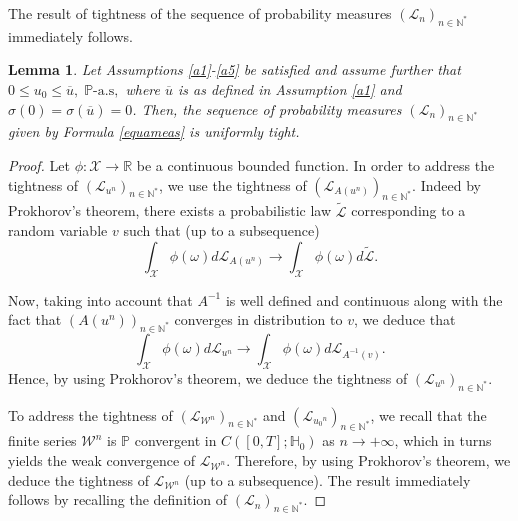 \documentclass[10pt,number,preprint,times]{elsarticle}
\numberwithin{equation}{section} %
\newtheorem{lem}{Lemma}[section]
\begin{document}
\color{black}
\noindent
The result of tightness of the sequence of probability measures $\left(\mathscr{L}_n\right)_{n \in \mathbb{N}^*}$ immediately follows. 
\begin{lem}\label{tight}
	Let Assumptions \ref{a1}-\ref{a5} be satisfied and assume further that $0 \leq u_0 \leq \overline{u},\; \mathbb{P}\text{-a.s},$ where $\overline{u}$ is as defined in Assumption \ref{a1} and $\sigma(0)=\sigma(\overline{u})=0$. Then, the sequence of probability measures $\left(\mathscr{L}_n\right)_{n \in \mathbb{N}^*}$ given by Formula \eqref{equameas} is uniformly tight.
\end{lem}
\begin{proof}
	
	\noindent
	Let $\phi : \mathscr{X} \rightarrow \mathbb{R}$ be a continuous bounded function.  In order to address the tightness of $\left(\mathscr{L}_{u^n}\right)_{n \in \mathbb{N}^*}$, we use the tightness of $\left(\mathscr{L}_{A(u^n)}\right)_{n \in \mathbb{N}^*}$. Indeed by Prokhorov's theorem, there exists a probabilistic law $\tilde{\mathscr{L}}$ corresponding to a random variable $v$ such that (up to a subsequence) 
	$$
	\int_{\mathscr{X}} \phi(\omega) d\mathscr{L}_{A(u^n)} \rightarrow \int_{\mathscr{X}} \phi(\omega) d\tilde{\mathscr{L}}.
	$$
	
	\noindent
	Now, taking into account that $A^{-1}$ is well defined and continuous along with the fact that $(A(u^n))_{n \in \mathbb{N}^*}$ converges in distribution to $v$, we deduce that 
	$$
	\int_{\mathscr{X}} \phi(\omega) d\mathscr{L}_{u^n} \rightarrow \int_{\mathscr{X}} \phi(\omega) d{\mathscr{L}_{A^{-1}(v)}}.
	$$
	\noindent
	Hence, by using Prokhorov's theorem, we deduce the tightness of $\left(\mathscr{L}_{u^n}\right)_{n \in \mathbb{N}^*}$.
	
	\noindent 
	To address the tightness of $\left(\mathcal{L}_{{\mathcal{W}}^n}\right)_{n \in \mathbb{N}^*}$ and $\left(\mathcal{L}_{{u_0}^n}\right)_{n \in \mathbb{N}^*}$, we recall that the finite series $\mathcal{W}^n$ is $\mathbb{P}$ convergent in $C([0,T];\mathbb{H}_0)$ as $n\rightarrow +\infty$, which in turns yields the weak convergence of $\mathscr{L}_{\mathcal{W}^n}$. Therefore, by using Prokhorov's theorem, we deduce the tightness of $\mathscr{L}_{\mathcal{W}^n}$ (up to a subsequence). The result immediately follows by recalling the definition of $\left(\mathscr{L}_n\right)_{n \in \mathbb{N}^*}$.
\end{proof}
\end{document}
